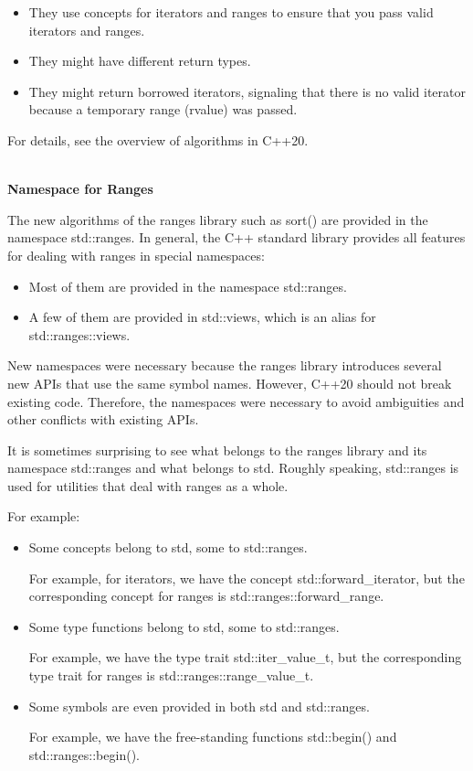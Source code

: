 \begin{itemize}
\item
They use concepts for iterators and ranges to ensure that you pass valid iterators and ranges.

\item
They might have different return types.

\item
They might return borrowed iterators, signaling that there is no valid iterator because a temporary range (rvalue) was passed.
\end{itemize}

For details, see the overview of algorithms in C++20.

\noindent
\hspace*{\fill} \\ %
\textbf{Namespace for Ranges}

The new algorithms of the ranges library such as sort() are provided in the namespace std::ranges. In general, the C++ standard library provides all features for dealing with ranges in special namespaces:

\begin{itemize}
\item
Most of them are provided in the namespace std::ranges.

\item
A few of them are provided in std::views, which is an alias for std::ranges::views.
\end{itemize}

New namespaces were necessary because the ranges library introduces several new APIs that use the same symbol names. However, C++20 should not break existing code. Therefore, the namespaces were necessary to avoid ambiguities and other conflicts with existing APIs.

It is sometimes surprising to see what belongs to the ranges library and its namespace std::ranges and what belongs to std. Roughly speaking, std::ranges is used for utilities that deal with ranges as a whole.

For example:

\begin{itemize}
\item
Some concepts belong to std, some to std::ranges.

For example, for iterators, we have the concept std::forward\_iterator, but the corresponding concept for ranges is std::ranges::forward\_range.

\item
Some type functions belong to std, some to std::ranges.

For example, we have the type trait std::iter\_value\_t, but the corresponding type trait for ranges is std::ranges::range\_value\_t.

\item
Some symbols are even provided in both std and std::ranges.

For example, we have the free-standing functions std::begin() and std::ranges::begin().
\end{itemize}

